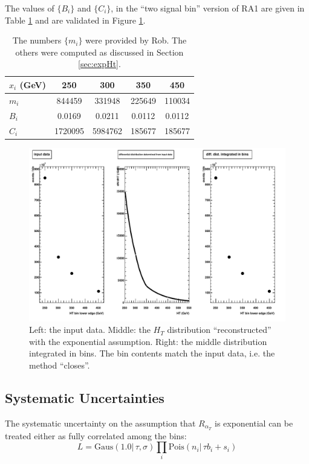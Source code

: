 \documentclass[12pt]{article}
\begin{document}
The values of $\{B_i\}$ and $\{C_i\}$, in the ``two signal bin'' version of RA1 are given in Table \ref{tab:bsandcs}
and are validated in Figure \ref{fig:validationPlots}.
\begin{table}[hb]
  \begin{tabular}{| l | c c c c |}
    \hline
    $x_i$ (GeV) & 250 & 300 & 350 & 450 \\
    \hline
    $m_i$ & 844459 & 331948 & 225649 & 110034 \\
    $B_i$ & 0.0169 & 0.0211 & 0.0112 & 0.0112 \\
    $C_i$ & 1720095 & 5984762 & 185677 & 185677 \\
    \hline
  \end{tabular}
  \caption{The numbers $\{m_i\}$ were provided by Rob.  The others were computed as discussed in Section \ref{sec:expHt}.}
  \label{tab:bsandcs}
\end{table}

\begin{figure}[ht]
  \includegraphics[width=1.2\textwidth]{totalBackgroundExpHt}
  \caption{Left: the input data.
    Middle: the $H_T$ distribution ``reconstructed'' with the exponential assumption.
    Right: the middle distribution integrated in bins.  The bin contents match the input data, i.e. the method ``closes''.}
  \label{fig:validationPlots}
\end{figure}

\subsection{Systematic Uncertainties}
\label{sec:sysUnc}
The systematic uncertainty on the assumption that $R_{\alpha_T}$ is exponential can be treated either as 
fully correlated among the bins:
\begin{equation}
L=\mathrm{Gaus}(1.0 |\,\tau, \sigma)\prod_i \mathrm{Pois}(n_i |\, \tau b_i + s_i)
\end{equation}
\end{document}
